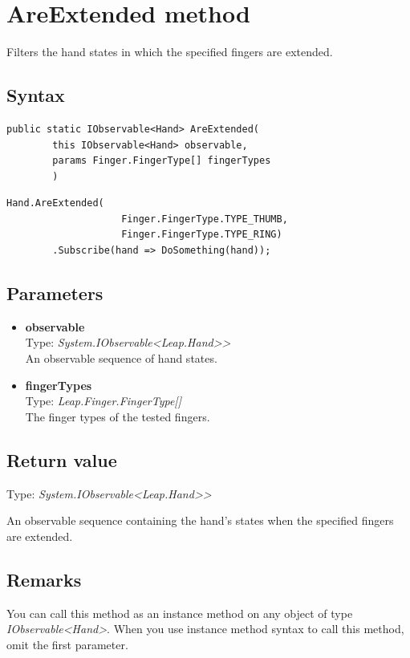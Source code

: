 \documentclass[12pt,a4paper,twoside]{report}
\begin{document}
\newpage

\section{AreExtended method}
Filters the hand states in which the specified fingers are extended.

\subsection{Syntax}
\begin{lstlisting}[caption=Declaration]
     public static IObservable<Hand> AreExtended(
        this IObservable<Hand> observable,
        params Finger.FingerType[] fingerTypes
        )
\end{lstlisting}

\begin{lstlisting}[caption=Usage example]
    Hand.AreExtended(
                    Finger.FingerType.TYPE_THUMB,
                    Finger.FingerType.TYPE_RING)
        .Subscribe(hand => DoSomething(hand));
\end{lstlisting}

\subsection{Parameters}
\begin{itemize}
    \item \textbf{observable}\\
    Type: \textit{System.IObservable<Leap.Hand>{}>}\\
    An observable sequence of hand states.
    
    \item \textbf{fingerTypes}\\
    Type: \textit{Leap.Finger.FingerType[]}\\
    The finger types of the tested fingers.
\end{itemize}

\subsection{Return value}
Type: \textit{System.IObservable<Leap.Hand>{}>}

An observable sequence containing the hand's states when the specified fingers are extended.

\subsection{Remarks}
You can call this method as an instance method on any object of type \textit{IObservable<Hand>}. When you use 
instance method syntax to call this method, omit the first parameter.
\end{document}
